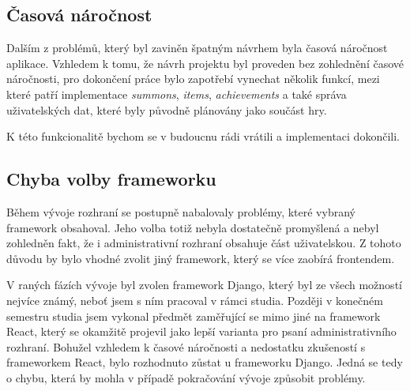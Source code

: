 \subsection*{Časová náročnost}
\label{subsec:implementation-problems-time}
Dalším z problémů, který byl zaviněn špatným návrhem byla časová náročnost aplikace. Vzhledem k tomu, že návrh projektu byl proveden bez zohlednění časové náročnosti, pro dokončení práce bylo zapotřebí vynechat několik funkcí, mezi které patří implementace \textit{summons}, \textit{items}, \textit{achievements} a také správa uživatelských dat, které byly původně plánovány jako součást hry.

K této funkcionalitě bychom se v budoucnu rádi vrátili a implementaci dokončili.

\subsection*{Chyba volby frameworku}
\label{subsec:implementation-problems-framework}
Během vývoje rozhraní se postupně nabalovaly problémy, které vybraný framework obsahoval. Jeho volba totiž nebyla dostatečně promyšlená a nebyl zohledněn fakt, že i administrativní rozhraní obsahuje část uživatelskou. Z tohoto důvodu by bylo vhodné zvolit jiný framework, který se více zaobírá frontendem.

V raných fázích vývoje byl zvolen framework Django, který byl ze všech možností nejvíce známý, neboť jsem s ním pracoval v rámci studia. Později v konečném semestru studia jsem vykonal předmět zaměřující se mimo jiné na framework React, který se okamžitě projevil jako lepší varianta pro psaní administrativního rozhraní. Bohužel vzhledem k časové náročnosti a nedostatku zkušeností s frameworkem React, bylo rozhodnuto zůstat u frameworku Django. Jedná se tedy o chybu, která by mohla v případě pokračování vývoje způsobit problémy.

\endinput